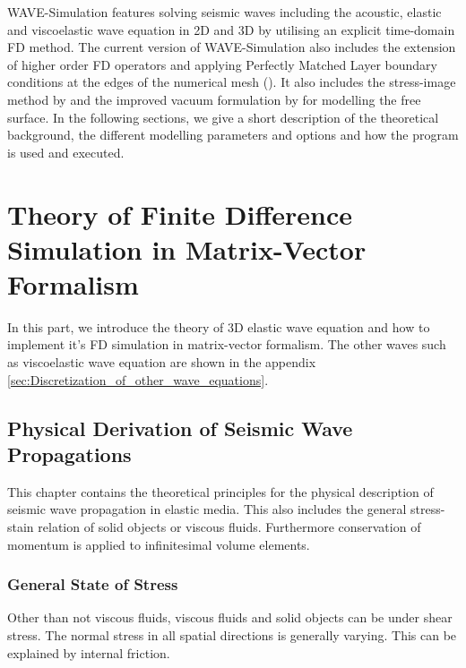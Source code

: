 \documentclass[pdftex,a4paper,parskip,listof=totoc,bibliography=totoc,onehalfspacing,12pt]{scrreprt}
\begin{document}
WAVE-Simulation features solving seismic waves including the acoustic, elastic and viscoelastic wave equation in 2D and 3D by utilising an explicit time-domain FD method. The current version of WAVE-Simulation also includes the extension of higher order FD operators and applying Perfectly Matched Layer boundary conditions at the edges of the numerical mesh (\cite{komatitsch2007unsplit}). It also includes the stress-image method by \cite{levander1988fourth} and the improved vacuum formulation by \cite{zeng2012improved} for modelling the free surface. In the following sections, we give a short description of the  theoretical background, the different modelling parameters and options and how the program is used and executed.

\cleardoublepage
\part{Theory of Finite Difference Simulation in Matrix-Vector Formalism}

In this part, we introduce the theory of 3D elastic wave equation and how to implement it's FD simulation in matrix-vector formalism. The other waves such as viscoelastic wave equation are shown in the appendix 
\ref{sec:Discretization_of_other_wave_equations}.

\chapter{Physical Derivation of Seismic Wave Propagations}

This chapter contains the theoretical principles for the physical description of seismic wave propagation in elastic media. This also includes the general stress-stain relation of solid objects or viscous fluids. Furthermore conservation of momentum is applied to infinitesimal volume elements.

\section{General State of Stress}
\label{kap:AllSp}

Other than not viscous fluids, viscous fluids and solid objects can be under shear stress. The normal stress in all spatial directions is generally varying. This can be explained by internal friction.
\end{document}
